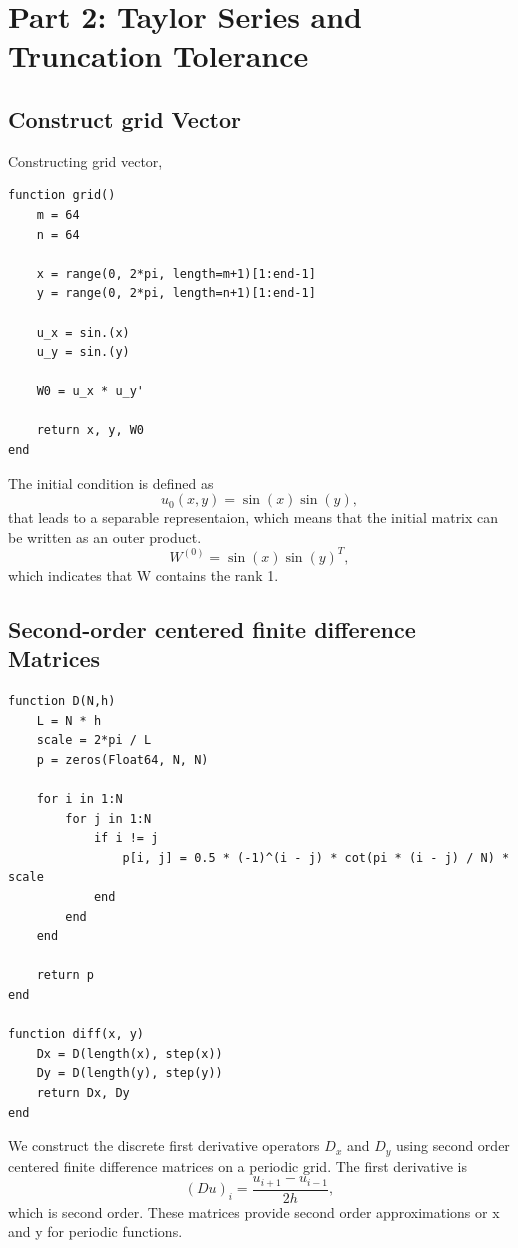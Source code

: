 \documentclass[11pt]{report}
\begin{document}
\section{Part 2: Taylor Series and Truncation Tolerance}

\subsection{Construct grid Vector}
Constructing grid vector,
\begin{lstlisting}
function grid()
    m = 64
    n = 64

    x = range(0, 2*pi, length=m+1)[1:end-1]
    y = range(0, 2*pi, length=n+1)[1:end-1]

    u_x = sin.(x)
    u_y = sin.(y)

    W0 = u_x * u_y'

    return x, y, W0
end

\end{lstlisting}
The initial condition is defined as
\[
u_0(x,y) = \sin(x)\sin(y),
\]
that leads to a separable representaion, which means that the initial matrix can be written as an outer product.
\[
W^{(0)} = \sin(x)\sin(y)^T,
\]
which indicates that W contains the rank 1.

\subsection{Second-order centered finite difference Matrices}

\begin{lstlisting}
function D(N,h)
    L = N * h
    scale = 2*pi / L
    p = zeros(Float64, N, N)

    for i in 1:N
        for j in 1:N
            if i != j
                p[i, j] = 0.5 * (-1)^(i - j) * cot(pi * (i - j) / N) * scale
            end
        end
    end

    return p
end

function diff(x, y)
    Dx = D(length(x), step(x))
    Dy = D(length(y), step(y))
    return Dx, Dy
end

\end{lstlisting}

We construct the discrete first derivative operators $D_x$ and $D_y$ using second order centered finite difference matrices on a periodic grid. 
The first derivative is
\[
(Du)_i = \frac{u_{i+1} - u_{i-1}}{2h},
\]
which is second order. These matrices provide second order approximations or x and y for periodic functions.
\end{document}
